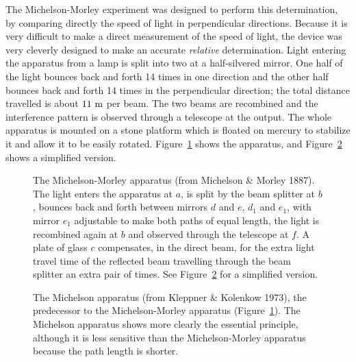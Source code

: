 The Michelson-Morley experiment was designed to perform this
determination, by comparing directly the speed of light in
perpendicular directions.  Because it is very difficult to make a
direct measurement of the speed of light, the device was very cleverly
designed to make an accurate {\em relative\/} determination.  Light
entering the apparatus from a lamp is split into two at a
half-silvered mirror.  One half of the light bounces back and forth 14
times in one direction and the other half bounces back and forth 14
times in the perpendicular direction; the total distance travelled is
about $11~{\rm m}$ per beam.  The two beams are recombined and the
interference pattern is observed through a telescope at the output.
The whole apparatus is mounted on a stone platform which is floated on
mercury to stabilize it and allow it to be easily rotated.
Figure~\ref{fig:mm} shows the apparatus, and Figure~\ref{fig:m} shows
a simplified version.
\begin{figure}
\caption[The Michelson-Morley apparatus]{The Michelson-Morley
apparatus (from Michelson \& Morley 1887).  The light enters the
apparatus at $a$, is split by the beam splitter at $b$, bounces back
and forth between mirrors $d$ and $e$, $d_1$ and $e_1$, with mirror
$e_1$ adjustable to make both paths of equal length, the light is
recombined again at $b$ and observed through the telescope at $f$.  A
plate of glass $c$ compensates, in the direct beam, for the extra
light travel time of the reflected beam travelling through the beam
splitter an extra pair of times.  See Figure~\ref{fig:m} for a
simplified version.}
\label{fig:mm}
\end{figure}
\begin{figure}
\caption[The Michelson apparatus]{The Michelson
apparatus (from Kleppner \& Kolenkow 1973), the predecessor to the
Michelson-Morley apparatus (Figure~\ref{fig:mm}).  The Michelson
apparatus shows more clearly the essential principle, although it is
less sensitive than the Michelson-Morley apparatus because the path
length is shorter.}
\label{fig:m}
\end{figure}

